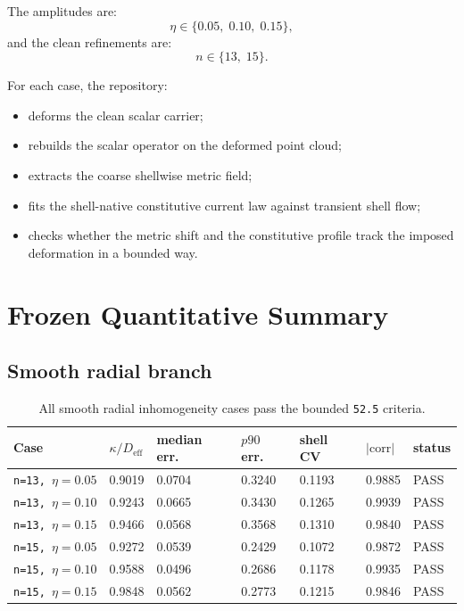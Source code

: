 \documentclass[11pt]{article}
\begin{document}
The amplitudes are:
\[
\eta \in \{0.05,\; 0.10,\; 0.15\},
\]
and the clean refinements are:
\[
n \in \{13,\; 15\}.
\]

For each case, the repository:
\begin{itemize}
\item deforms the clean scalar carrier;
\item rebuilds the scalar operator on the deformed point cloud;
\item extracts the coarse shellwise metric field;
\item fits the shell-native constitutive current law against transient shell flow;
\item checks whether the metric shift and the constitutive profile track the imposed deformation in a bounded way.
\end{itemize}

\section{Frozen Quantitative Summary}

\subsection{Smooth radial branch}

\begin{table}[h!]
\centering
\begin{tabular}{@{}p{2.4cm}p{1.4cm}p{1.5cm}p{1.5cm}p{1.4cm}p{1.4cm}p{1.2cm}@{}}
\toprule
Case & \(\kappa/D_{\mathrm{eff}}\) & median err. & \(p90\) err. & shell CV & \(|\mathrm{corr}|\) & status \\
\midrule
\texttt{n=13,\ \(\eta=0.05\)} & 0.9019 & 0.0704 & 0.3240 & 0.1193 & 0.9885 & PASS \\
\texttt{n=13,\ \(\eta=0.10\)} & 0.9243 & 0.0665 & 0.3430 & 0.1265 & 0.9939 & PASS \\
\texttt{n=13,\ \(\eta=0.15\)} & 0.9466 & 0.0568 & 0.3568 & 0.1310 & 0.9840 & PASS \\
\texttt{n=15,\ \(\eta=0.05\)} & 0.9272 & 0.0539 & 0.2429 & 0.1072 & 0.9872 & PASS \\
\texttt{n=15,\ \(\eta=0.10\)} & 0.9588 & 0.0496 & 0.2686 & 0.1178 & 0.9935 & PASS \\
\texttt{n=15,\ \(\eta=0.15\)} & 0.9848 & 0.0562 & 0.2773 & 0.1215 & 0.9846 & PASS \\
\bottomrule
\end{tabular}
\caption{All smooth radial inhomogeneity cases pass the bounded \texttt{52.5} criteria.}
\end{table}
\end{document}
